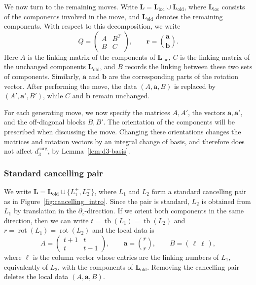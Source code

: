 \documentclass{amsart}
\numberwithin{equation}{section}
\numberwithin{figure}{section}
\theoremstyle{definition}
\theoremstyle{remark}
\DeclareMathOperator{\tb}{tb}
\DeclareMathOperator{\rot}{rot}
\begin{document}
We now turn to the remaining moves. Write $\boldsymbol L=\boldsymbol L_{\mathrm{loc}}\cup \boldsymbol L_{\mathrm{old}}$, where \(\boldsymbol L_{\mathrm{loc}}\) consists of the components involved in the move, and \(\boldsymbol L_{\mathrm{old}}\) denotes the remaining components. With respect to this decomposition, we write
\[
Q=
\begin{pmatrix}
A & B^T \\
B & C
\end{pmatrix},
\qquad
\boldsymbol r=\binom{\boldsymbol a}{\boldsymbol b}.
\]
Here \(A\) is the linking matrix of the components of $\boldsymbol L_{\mathrm{loc}}$, \(C\) is the linking matrix of the unchanged components $\boldsymbol L_{\mathrm{old}}$, and \(B\) records the linking between these two sets of components. Similarly, \(\boldsymbol a\) and \(\boldsymbol b\) are the corresponding parts of the rotation vector.
After performing the move, the data \((A,\boldsymbol a,B)\) is replaced by \((A',\boldsymbol a',B')\), while \(C\) and \(\boldsymbol b\) remain unchanged. 

For each generating move, we now specify the matrices \(A,A'\), the vectors \(\boldsymbol a,\boldsymbol a'\), and the off-diagonal blocks \(B,B'\). The orientation of the components will be prescribed when discussing the move. Changing these orientations changes the matrices and rotation vectors by an integral change of basis, and therefore does not affect \(d_3^{\mathrm{surg}}\), by Lemma~\ref{lem:d3-basis}.

\subsubsection*{Standard cancelling pair}
We write $\boldsymbol L=\boldsymbol L_{\mathrm{old}}\cup\{L_1^+,L_2^-\}$, where \(L_1\) and \(L_2\) form a standard cancelling pair as in
Figure~\ref{fig:cancelling_intro}. Since the pair is standard, \(L_2\) is obtained from \(L_1\) by translation in the \(\partial_z\)-direction. If we orient both components in the same direction, then we can write $t=\tb(L_1)=\tb(L_2)$ and $r=\rot(L_1)=\rot(L_2)$ and the local data is
\[
A=
\begin{pmatrix}
t+1 & t\\
t & t-1
\end{pmatrix},
\qquad
\boldsymbol a=
\binom{r}{r},
\qquad
B=
\begin{pmatrix}
\boldsymbol\ell & \boldsymbol\ell
\end{pmatrix},
\]
where \(\boldsymbol\ell\) is the column vector whose entries are the linking
numbers of \(L_1\), equivalently of \(L_2\), with the components of
\(\boldsymbol L_{\mathrm{old}}\). Removing the cancelling pair deletes the
local data \((A,\boldsymbol a,B)\).
  
\end{document}
